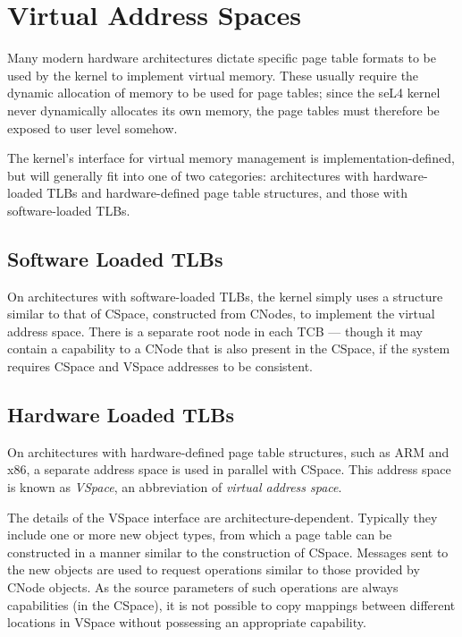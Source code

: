 \section[vm]{Virtual Address Spaces}

Many modern hardware architectures dictate specific page table formats to be
used by the kernel to implement virtual memory. These usually require the
dynamic allocation of memory to be used for page tables; since the seL4 kernel
never dynamically allocates its own memory, the page tables must therefore be
exposed to user level somehow.

The kernel's interface for virtual memory management is
implementation-defined, but will generally fit into one of two categories:
architectures with hardware-loaded TLBs and hardware-defined page table
structures, and those with software-loaded TLBs.

\subsection{Software Loaded TLBs}

On architectures with software-loaded TLBs, the kernel simply uses a structure
similar to that of CSpace, constructed from CNodes, to implement the virtual
address space. There is a separate root node in each TCB --- though it may
contain a capability to a CNode that is also present in the CSpace, if the
system requires CSpace and VSpace addresses to be consistent.

\subsection{Hardware Loaded TLBs}

On architectures with hardware-defined page table structures, such as ARM and
x86, a separate address space is used in parallel with CSpace. This address
space is known as \emph{VSpace}, an abbreviation of \emph{virtual address
space}.

The details of the VSpace interface are architecture-dependent. Typically they
include one or more new object types, from which a page table can be
constructed in a manner similar to the construction of CSpace. Messages sent
to the new objects are used to request operations similar to those provided by
CNode objects. As the source parameters of such operations are always
capabilities (in the CSpace), it is not possible to copy mappings between
different locations in VSpace without possessing an appropriate capability.

